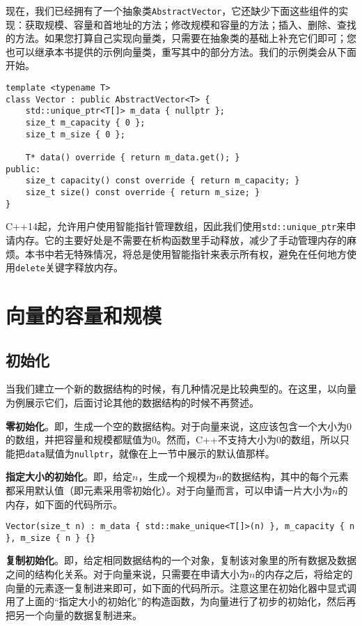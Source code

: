 现在，我们已经拥有了一个抽象类\lstinline{AbstractVector}，它还缺少下面这些组件的实现：获取规模、容量和首地址的方法；修改规模和容量的方法；插入、删除、查找的方法。如果您打算自己实现向量类，只需要在抽象类的基础上补充它们即可；您也可以继承本书提供的示例向量类，重写其中的部分方法。我们的示例类会从下面开始。

\begin{lstlisting}
template <typename T>
class Vector : public AbstractVector<T> {
    std::unique_ptr<T[]> m_data { nullptr };
    size_t m_capacity { 0 };
    size_t m_size { 0 };

    T* data() override { return m_data.get(); }
public:
    size_t capacity() const override { return m_capacity; }
    size_t size() const override { return m_size; }
}
\end{lstlisting}

C++14起，允许用户使用智能指针管理数组，因此我们使用\lstinline{std::unique_ptr}来申请内存。它的主要好处是不需要在析构函数里手动释放，减少了手动管理内存的麻烦。本书中若无特殊情况，将总是使用智能指针来表示所有权，避免在任何地方使用\lstinline{delete}关键字释放内存。

\section{向量的容量和规模}
\subsection{初始化}

当我们建立一个新的数据结构的时候，有几种情况是比较典型的。在这里，以向量为例展示它们，后面讨论其他的数据结构的时候不再赘述。

\textbf{零初始化}。即，生成一个空的数据结构。对于向量来说，这应该包含一个大小为0的数组，并把容量和规模都赋值为0。然而，C++不支持大小为0的数组，所以只能把\lstinline{data}赋值为\lstinline{nullptr}，就像在上一节中展示的默认值那样。

\textbf{指定大小的初始化}。即，给定$n$，生成一个规模为$n$的数据结构，其中的每个元素都采用默认值（即元素采用零初始化）。对于向量而言，可以申请一片大小为$n$的内存，如下面的代码所示。

\begin{lstlisting}
Vector(size_t n) : m_data { std::make_unique<T[]>(n) }, m_capacity { n }, m_size { n } {}
\end{lstlisting}

\textbf{复制初始化}。即，给定相同数据结构的一个对象，复制该对象里的所有数据及数据之间的结构化关系。对于向量来说，只需要在申请大小为$n$的内存之后，将给定的向量的元素逐一复制进来即可，如下面的代码所示。注意这里在初始化器中显式调用了上面的“指定大小的初始化”的构造函数，为向量进行了初步的初始化，然后再把另一个向量的数据复制进来。


